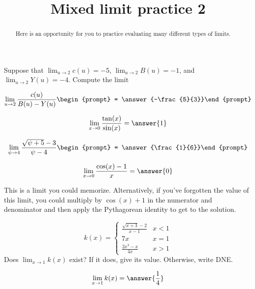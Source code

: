 \documentclass[handout]{ximera}
\title{Mixed limit practice 2}
\begin{document}
\begin{abstract}
Here is an opportunity for you to practice evaluating many different types of limits. 
\end{abstract}
\maketitle

\begin{exercise}
Suppose that $\displaystyle\lim_{u\to2}c(u)=-5$, $\displaystyle\lim_{u\to2}B(u)=-1$, and $\displaystyle\lim_{u\to2}Y(u)=-4$. Compute the limit

\[
\lim_{u\to 2 } \frac{c(u)}{B(u)-Y(u)}\begin{prompt} = \answer{-\frac{5}{3}}\end{prompt}
\]
\end{exercise}

\begin{exercise}
\[\lim_{x \to 0} \frac{\tan(x)}{\sin(x)} = \answer{1}\]
\end{exercise}

\begin{exercise}
\[
\lim_{\psi\to 4 } \frac{\sqrt{\psi +5}-3}{\psi -4}\begin{prompt} = \answer{\frac{1}{6}}\end{prompt}
\]
\end{exercise}

\begin{exercise}
\[\lim_{x \to 0} \frac{\cos(x)-1}{x} = \answer{0}\]

\begin{hint}
This is a limit you could memorize.  Alternatively, if you've forgotten the value of this limit, you could multiply by $\cos(x)+1$ in the numerator and denominator and then apply the Pythagorean identity to get to the solution.
\end{hint}

\end{exercise}

\begin{exercise}
\[
k(x) = \begin{cases}
  \frac{\sqrt{x+3}-2}{x-1}  & x<1 \\
  7x & x=1 \\
  \frac{2x^3 -x}{4x} & x > 1
\end{cases}
\]
Does $\lim_{x \to 1} k(x)$ exist?  If it does, give its value.
Otherwise, write DNE.

\[
\lim_{x \to 1} k(x) = \answer{\frac{1}{4}}
\]
\end{exercise}
\end{document}
